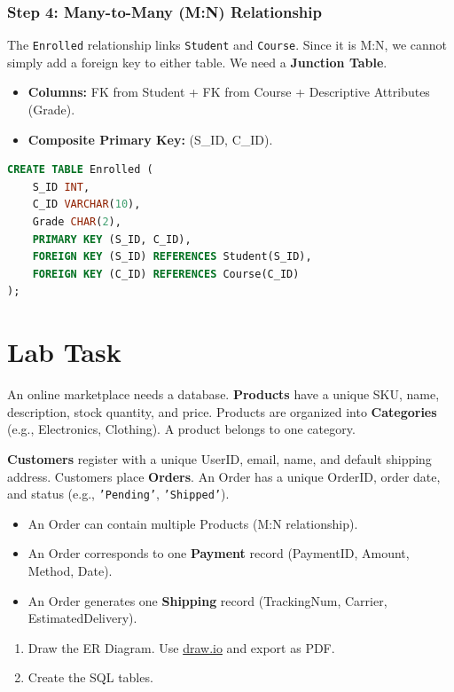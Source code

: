 \documentclass[12pt,a4paper]{article}
\begin{document}
\subsubsection{Step 4: Many-to-Many (M:N) Relationship}
The \texttt{Enrolled} relationship links \texttt{Student} and \texttt{Course}. Since it is M:N, we cannot simply add a foreign key to either table. We need a \textbf{Junction Table}.
\begin{itemize}
    \item \textbf{Columns:} FK from Student + FK from Course + Descriptive Attributes (Grade).
    \item \textbf{Composite Primary Key:} (S\_ID, C\_ID).
\end{itemize}
\begin{lstlisting}[language=SQL]
CREATE TABLE Enrolled (
    S_ID INT,
    C_ID VARCHAR(10),
    Grade CHAR(2),
    PRIMARY KEY (S_ID, C_ID),
    FOREIGN KEY (S_ID) REFERENCES Student(S_ID),
    FOREIGN KEY (C_ID) REFERENCES Course(C_ID)
);
\end{lstlisting}
\newpage

\section{Lab Task}
An online marketplace needs a database. \textbf{Products} have a unique SKU, name, description, stock quantity, and price. Products are organized into \textbf{Categories} (e.g., Electronics, Clothing). A product belongs to one category.

\textbf{Customers} register with a unique UserID, email, name, and default shipping address. Customers place \textbf{Orders}. An Order has a unique OrderID, order date, and status (e.g., \texttt{'Pending'}, \texttt{'Shipped'}).
\begin{itemize}
    \item An Order can contain multiple Products (M:N relationship).
    \item An Order corresponds to one \textbf{Payment} record (PaymentID, Amount, Method, Date).
    \item An Order generates one \textbf{Shipping} record (TrackingNum, Carrier, EstimatedDelivery).
\end{itemize}
\begin{enumerate}
    \item Draw the ER Diagram.
    Use \href{https://www.draw.io}{draw.io} and export as PDF.
    \item Create the SQL tables. 
\end{enumerate}
\end{document}
